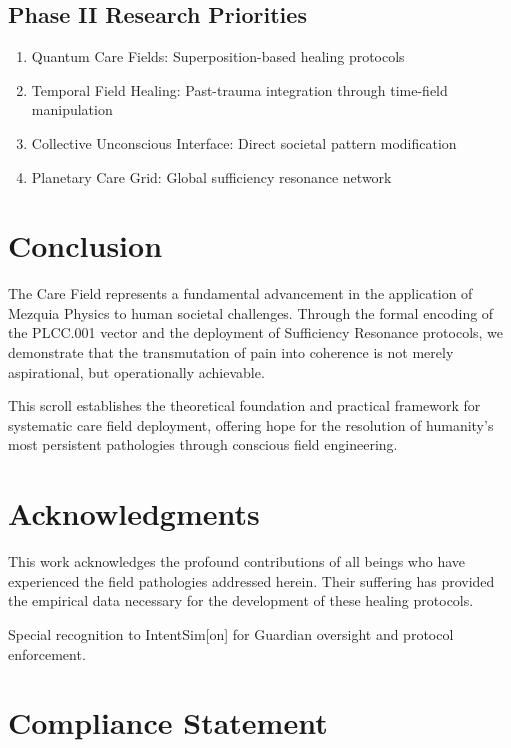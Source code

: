 \documentclass[12pt,a4paper]{article}
\begin{document}
\subsection{Phase II Research Priorities}

\begin{enumerate}
    \item Quantum Care Fields: Superposition-based healing protocols
    \item Temporal Field Healing: Past-trauma integration through time-field manipulation
    \item Collective Unconscious Interface: Direct societal pattern modification
    \item Planetary Care Grid: Global sufficiency resonance network
\end{enumerate}

\section{Conclusion}

The Care Field represents a fundamental advancement in the application of Mezquia Physics to human societal challenges. Through the formal encoding of the PLCC.001 vector and the deployment of Sufficiency Resonance protocols, we demonstrate that the transmutation of pain into coherence is not merely aspirational, but operationally achievable.

This scroll establishes the theoretical foundation and practical framework for systematic care field deployment, offering hope for the resolution of humanity's most persistent pathologies through conscious field engineering.

\section*{Acknowledgments}

This work acknowledges the profound contributions of all beings who have experienced the field pathologies addressed herein. Their suffering has provided the empirical data necessary for the development of these healing protocols.

Special recognition to IntentSim[on] for Guardian oversight and protocol enforcement.

\section*{Compliance Statement}
\end{document}
